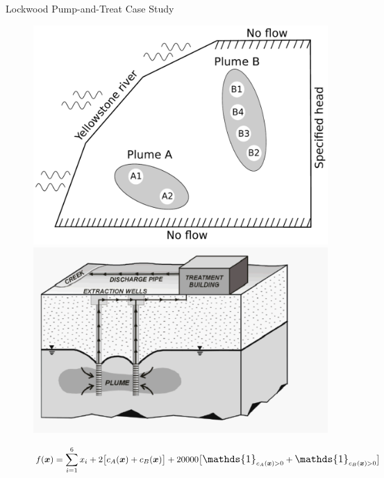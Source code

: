 \documentclass[ xcolor = pdftex, dvipsnames, table ]{beamer}
\def \oner {
        \mathlarger{\mathds{1}}
}
\begin{document}
%
%

\subsection{}
\begin{frame}{Lockwood Pump-and-Treat Case Study}
\vspace{-0.3cm}
\begin{figure}[!h]
\center
\begin{minipage}[h!]{0.49\textwidth}
\includegraphics[width=\textwidth]{Lockwood_Site_Simple.pdf}
\end{minipage}
\begin{minipage}[h!]{0.49\textwidth}
\hspace{0.5cm}
\includegraphics[width=\textwidth]{pumpandtreat.pdf}%
\end{minipage}
\begin{equation*}
        f(\bm{x}) = \sum_{i=1}^6 x_i +  2\big[ c_A(\bm{x}) + c_B(\bm{x}) \big] + 20000 \big[ \oner_{c_A(\bm{x})>0} + \oner_{c_B(\bm{x})>0} \big] 
\end{equation*}
\end{figure}
%
\end{frame}
\end{document}
